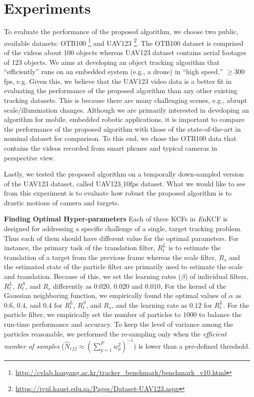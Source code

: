 \documentclass{bmvc2k}
\begin{document}
\section{Experiments} \label{sc:Experiments}
To evaluate the performance of the proposed algorithm, we choose two
public, available datasets:
OTB100 \footnote{\url{http://cvlab.hanyang.ac.kr/tracker_benchmark/benchmark_v10.html}}
and
UAV123 \footnote{\url{https://ivul.kaust.edu.sa/Pages/Dataset-UAV123.aspx}}\cite{mueller2016uav123}.
The OTB100 dataset is comprised of the videos about 100 objects
whereas UAV123 dataset contains aerial footages of 123 objects. We
aims at developing an object tracking algorithm that ``efficiently''
runs on an embedded system (e.g., a drone) in ``high speed,'' $\ge
300$ fps, e.g. Given this, we believe that the UAV123 video data is a
better fit in evaluating the performance of the proposed algorithm
than any other existing tracking datasets. This is because there are
many challenging scenes, e.g., abrupt scale/illumination
changes. Although we are primarily interested in developing an
algorithm for mobile, embedded robotic applications, it is important
to compare the performance of the proposed algorithm with those of the
state-of-the-art in nominal dataset for comparison. To this end, we
chose the OTB100 data that contains the videos recorded from smart
phones and typical cameras in perspective view. 

Lastly, we tested the proposed algorithm on a temporally down-sampled
version of the UAV123 dataset, called UAV123$\_$10fps dataset. What we
would like to see from this experiment is to evaluate how robust the
proposed algorithm is to drastic motions of camera and targets. 

\textbf{Finding Optimal Hyper-parameters} Each of three KCFs in {\it
  E}nKCF is designed for addressing a specific challenge of a single,
target tracking problem. Thus each of them should have different value
for the optimal parameters. For instance, the primary task of the
translation filter, $R_{t}^{L}$ is to estimate the translation of a
target from the previous frame whereas the scale filter, $R_{s}$ and
the estimated state of the particle filter are primarily used to
estimate the scale and translation. Because of this, we set the
learning rates ($\beta$) of individual filters, $R_{t}^{L}$,
$R_{t}^{S}$, and $R_{s}$ differently as $0.020$, $0.020$ and
$0.010$. For the kernel of the Gaussian neighboring function, we
empirically found the optimal values of $\alpha$ as $0.6$, $0.4$, and
$0.4$ for $R_{t}^{L}$, $R_{t}^{S}$, and $R_{s}$, and the learning rate
as $0.12$ for $R_{t}^{L}$. For the particle filter, we empirically set
the number of particles to $1000$ to balance the run-time performance
and accuracy. To keep the level of variance among the particles
reasonable, we performed the re-sampling only when the
\textit{efficient number of samples} ($ \hat{N}_{eff} \approx
(\sum_{p=1}^{P}w_{p}^{2})^{-1} $) is lower than a pre-defined
threshold. 
\end{document}
